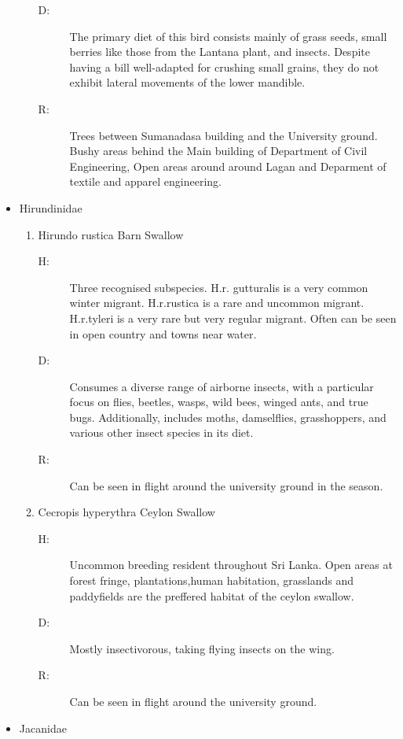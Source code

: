 \begin{itemize}
\begin{enumerate}
\begin{description}
\item[D: ]%
The primary diet of this bird consists mainly of grass seeds, small berries like those from the Lantana plant, and insects. Despite having a bill well{-}adapted for crushing small grains, they do not exhibit lateral movements of the lower mandible.%
\item[R: ]%
Trees between Sumanadasa building and the University ground. Bushy areas behind the Main building of Department of Civil Engineering, Open areas around around Lagan and Deparment of textile and apparel engineering.%
\end{description}%
\end{enumerate}%
\item%
Hirundinidae%
\begin{enumerate}%
\item%
Hirundo rustica\newline%
Barn Swallow%
\begin{description}%
\item[H: ]%
Three recognised subspecies. H.r. gutturalis is a very common winter migrant. H.r.rustica is a rare and uncommon migrant. H.r.tyleri is a very rare but very regular migrant. Often can be seen in open country and towns near water.%
\item[D: ]%
Consumes a diverse range of airborne insects, with a particular focus on flies, beetles, wasps, wild bees, winged ants, and true bugs. Additionally, includes moths, damselflies, grasshoppers, and various other insect species in its diet.%
\item[R: ]%
Can be seen in flight around the university ground in the season.%
\end{description}%
\item%
Cecropis hyperythra\newline%
Ceylon Swallow%
\begin{description}%
\item[H: ]%
Uncommon breeding resident throughout Sri Lanka. Open areas at forest fringe, plantations,human habitation, grasslands and paddyfields are the preffered habitat of the ceylon swallow.%
\item[D: ]%
Mostly insectivorous, taking flying insects on the wing.%
\item[R: ]%
Can be seen in flight around the university ground.%
\end{description}%
\end{enumerate}%
\item%
Jacanidae%
\begin{enumerate}%

\end{enumerate}
\end{itemize}
